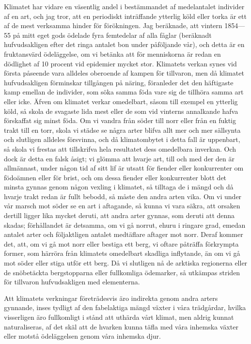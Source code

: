 Klimatet har vidare en väsentlig andel i bestämmandet af medelantalet individer af en art, och jag tror, att en periodiskt inträffande ytterlig köld eller torka är ett af de mest verksamma hinder för förökningen. Jag beräknade, att vintern 1854—55 på mitt eget gods ödelade fyra femtedelar af alla fåglar (beräknadt hufvudsakligen efter det ringa antalet bon under påföljande vår), och detta är en fruktansvärd ödeläggelse, om vi betänka att för menniskorna är redan en dödlighet af 10 procent vid epidemier mycket stor. Klimatets verkan synes vid första påseende vara alldeles oberoende af kampen för tillvaron, men då klimatet hufvudsakligen förminskar tillgången på näring, föranleder det den häftigaste kamp emellan de individer, som söka samma föda vare sig de tillhöra samma art eller icke. Äfven om klimatet verkar omedelbart, såsom till exempel en ytterlig köld, så skola de svagaste lida mest eller de som vid vinterns annalkande hafva förskaffat sig minst föda. Om vi vandra från söder till norr eller från en fuktig trakt till en torr, skola vi städse se några arter blifva allt mer och mer sällsynta och slutligen alldeles försvinna, och då klimatombytet i detta fall är uppenbart, så skola vi frestas att tillskrifva hela resultatet dess omedelbara inverkan. Och dock är detta en falsk åsigt; vi glömma att hvarje art, till och med der den är allmännast, under någon tid af sitt lif är utsatt för fiender eller konkurrenter om födoämnen eller för brist, och om dessa fiender eller konkurrenter blott det minsta gynnas genom någon vexling i klimatet, så tilltaga de i mängd och då hvarje trakt redan är fullt bebodd, så måste den andra arten vika. Om vi under vår marsch mot söder se en art i aftagande, så kunna vi vara säkra, att orsaken dertill ligger lika mycket deruti, att andra arter gynnas, som deruti att denna skadas; förhållandet är detsamma, om vi gå norrut, ehuru i ringare grad, emedan antalet arter och följaktligen antalet medtäflare aftager mot norr. Deraf kommer det, att, om vi gå mot norr eller bestiga ett berg, vi oftare påträffa förkrympta former, som härröra från klimatets omedelbart skadliga inflytande, än om vi gå mot söder eller stiga utför ett berg. Då vi slutligen nå de arktiska regionerna eller de snöbetäckta bergstopparna eller fullkomliga ödemarker, så utkämpas striden för tillvaron hufvudsakligen med elementerna.

Att klimatets verkningar företrädesvis äro indirekta genom andra arters gynnande, inses tydligt af den fabelaktiga mängd växter i våra trädgårdar, hvilka visserligen äro fullkomligt i stånd att uthärda vårt klimat, men aldrig kunnat naturaliseras, af det skäl att de hvarken kunna täfla med våra inhemska växter eller motstå ödeläggelsen genom våra inhemska djur.

